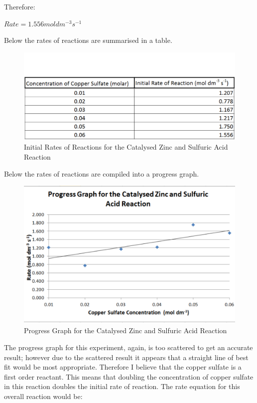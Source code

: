 Therefore:

$Rate = 1.556 mol dm^{-3} s^{-1}$

Below the rates of reactions are summarised in a table.

\begin{figure}[H]
    \includegraphics[width=\textwidth]{./Analysis/Images/3VaryCopperSulfate/Rates.pdf}
    \caption{Initial Rates of Reactions for the Catalysed Zinc and Sulfuric Acid Reaction} \label{fig:RatesSACSVary}
\end{figure}

Below the rates of reactions are compiled into a progress graph.

\begin{figure}[H]
    \includegraphics[width=\textwidth]{./Analysis/Images/3VaryCopperSulfate/ProgressGraph.pdf}
    \caption{Progress Graph for the Catalysed Zinc and Sulfuric Acid Reaction} \label{fig:ProgressGraphSACSVary}
\end{figure}

The progress graph for this experiment, again,  is too scattered to get an accurate result; however due to the scattered result it appears that a straight line of best fit would be most appropriate. Therefore I believe that the copper sulfate is a first order reactant. This means that doubling the concentration of copper sulfate in this reaction doubles the initial rate of reaction. The rate equation for this overall reaction would be:

